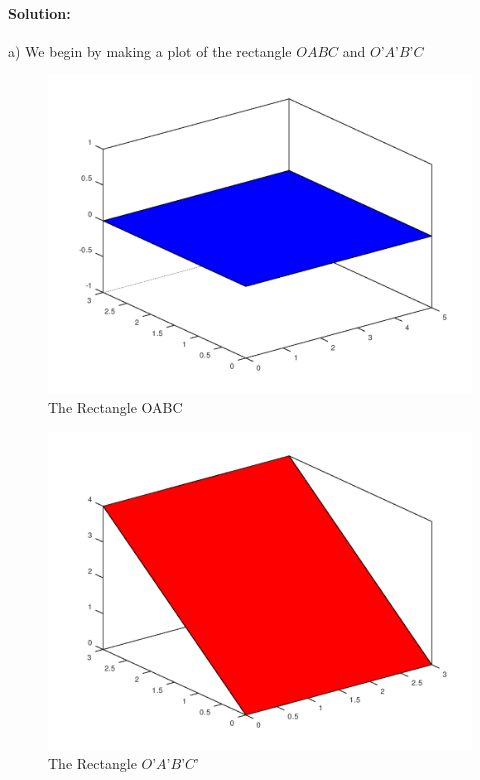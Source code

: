 \documentclass[12pt, letterpaper]{article}
\theoremstyle{statement}
\theoremstyle{statement}
\newenvironment{Solution}{\noindent\ignorespaces\paragraph{Solution:}}{\hfill \ding{122}\par\noindent}
\begin{document}
    \begin{Solution}
    a)
    We begin by making a plot of the rectangle $OABC$ and $O$'$A$'$B$'$C$
    
    \begin{figure}[H]
        \centering
        \includegraphics[scale=0.5]{box1.png}
        \caption{The Rectangle OABC}
        \label{fig:fig1}
    \end{figure}
    
    \begin{figure}[H]
        \centering
        \includegraphics[scale=0.5]{box2.png}
        \caption{The Rectangle $O$'$A$'$B$'$C$'}
        \label{fig:fig2}
    \end{figure}
    

\end{Solution}
\end{document}
